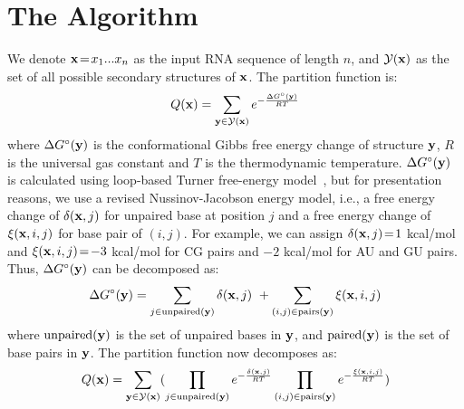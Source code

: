 \vspace{-0.4cm}
\section{The \linearpartition Algorithm}
\vspace{-0.1cm}


\newcommand{\pluseq}{\mathrel{+}=}


We denote $\mathbf{x}\!=\!x_1 ... x_n$ as the input RNA sequence of length $n$, and $\mathcal{Y(\mathbf{x})}$ as the set of all possible secondary structures of $\mathbf{x}$.  
The partition function is: %
\begin{equation}
	Q(\mathbf{x})=\sum_{\mathbf{y} \in \mathcal{Y(\mathbf x)}} e^{-\frac{\Delta G^{\circ}({\mathbf{y}})}{RT}} \notag
\end{equation}
where $\Delta G^{\circ}({\mathbf{y}})$ is the  conformational Gibbs free energy change of structure $\mathbf{y}$, 
$R$ is the universal gas constant 
and $T$ is the thermodynamic temperature.
$\Delta G^{\circ}({\mathbf{y}})$ is calculated using loop-based Turner free-energy model~\cite{mathews+:1999, Mathews+:2004}, 
but for presentation reasons, %
we use a revised Nussinov-Jacobson energy model, 
i.e., a free energy change of $\delta(\mathbf{x}, j)$ for unpaired base at position $j$ 
and a free energy change of $\xi(\mathbf{x}, i, j)$ for base pair of $(i,j)$.
For example, we can assign $\delta(\mathbf{x}, j)\!=\!1$ kcal/mol and $\xi(\mathbf{x}, i, j)\!=\!-3$ kcal/mol for CG pairs and $-2$ kcal/mol for AU and GU pairs. 
Thus, $\Delta G^{\circ}({\mathbf{y}})$
can be decomposed as:
\begin{equation}
	\Delta G^{\circ}({\mathbf{y}}) = \sum_{j \in \text{unpaired}(\mathbf{y})} \delta(\mathbf{x}, j) \ + \sum_{(i,j) \in \text{pairs}(\mathbf{y})} \xi(\mathbf{x}, i, j) \notag
\end{equation}
where ${\textrm {unpaired}}(\mathbf{y})$ is the set of unpaired bases in $\mathbf{y}$, 
and ${\textrm {paired}}(\mathbf{y})$ is the set of base pairs in $\mathbf{y}$.
The partition function now decomposes as: %
\begin{equation}
	Q(\mathbf{x})=\sum_{\mathbf{y} \in \mathcal{Y(\mathbf{x})}} (\prod_{j \in \text{unpaired}(\mathbf{y})} e^{-\frac{\delta(\mathbf{x}, j)}{RT}} \prod_{(i,j) \in \text{pairs}(\mathbf{y})} e^{-\frac{\xi(\mathbf{x}, i, j)}{RT}}) \notag
\end{equation}


